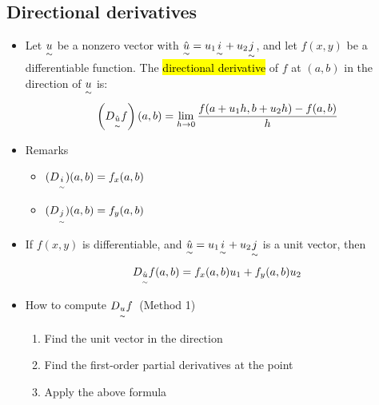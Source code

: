 \documentclass{article}
\begin{document}
  \subsection*{Directional derivatives}
  \begin{itemize}
  	\item \DEF Let $\underset{\sim}{u}$ be a nonzero vector with $\hat{\underset{\sim}{u}} = u_1 \underset{\sim}{i} + u_2 \underset{\sim}{j}$, and let $f(x,y)$ be a differentiable function. The \hl{directional derivative} of $f$ at $(a,b)$ in the direction of $\underset{\sim}{u}$ is:
  	\[
	\left( D_{\hat{\underset{\sim}{u}}} f \right)(a, b) = \lim_{h \to 0} \frac{f(a + u_1 h, b + u_2 h) - f(a, b)}{h}
	\]

	\item Remarks
	\begin{itemize}
		\item $(D_{\underset{\sim}{i} })(a,b) = f_x(a,b)$
		\item $(D_{\underset{\sim}{j} })(a,b) = f_y(a,b)$
	\end{itemize}

	\item If $f(x,y)$ is differentiable, and $\hat{\underset{\sim}{u}} = u_1\underset{\sim}{i} + u_2\underset{\sim}{j}$ is a unit vector, then
	$$
	D_{\hat{\underset{\sim}{u}}}f (a, b) = f_x(a,b)u_1 + f_y(a,b)u_2
	$$

	\item How to compute $D_{\underset{\sim}{u}}f$\ (Method 1)
		\begin{enumerate}
			\item Find the unit vector in the direction
			\item Find the first-order partial derivatives at the point
			\item Apply the above formula
		\end{enumerate}
  \end{itemize}
\end{document}
